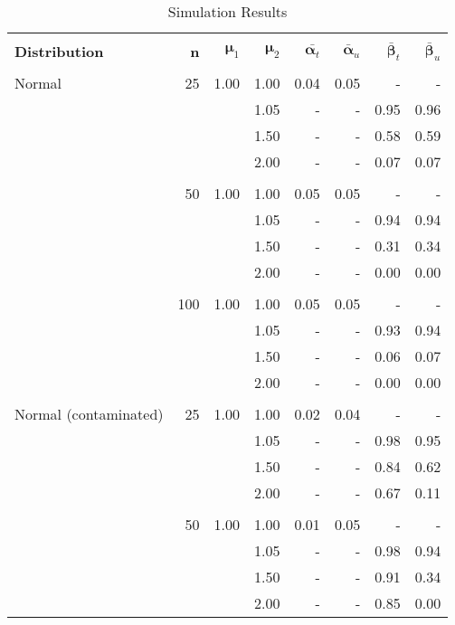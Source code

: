 \documentclass{report}
\begin{document}
\begin{table}[h]
	\centering
	\caption{Simulation Results}
	\vspace{1em}
	\begin{threeparttable}
		\begin{tabular}{|l r r r r r r r|}
			\hline
			& & & & & & & \\
			\textbf{Distribution} & 
			\textbf{n} & 
			$\bm{\mu}_1$ &
			$\bm{\mu}_2$ &
			$\bar{\bm{\alpha}_t}$ & 
			$\bar{\bm{\alpha}}_u$ & 
			$\bar{\bm{\beta}}_t$ &
			$\bar{\bm{\beta}}_u$ \\

			& & & & & & & \\

			Normal &  25 & 1.00 & 1.00 & 0.04 & 0.05 & - & - \\ 
			&  & & 1.05 & - & - & 0.95 & 0.96 \\ 
			&  & & 1.50 & - & - & 0.58 & 0.59 \\ 
			&  & & 2.00 & - & - & 0.07 & 0.07 \\ 
			& & & & & & & \\
			&  50 & 1.00 & 1.00 & 0.05 & 0.05 & - & - \\ 
			&  & & 1.05 & - & - & 0.94 & 0.94 \\ 
			&  & & 1.50 & - & - & 0.31 & 0.34 \\ 
			&  & & 2.00 & - & - & 0.00 & 0.00 \\ 
			& & & & & & & \\
			& 100 & 1.00 & 1.00 & 0.05 & 0.05 & - & - \\ 
			& & & 1.05 & - & - & 0.93 & 0.94 \\ 
			& & & 1.50 & - & - & 0.06 & 0.07 \\ 
			& & & 2.00 & - & - & 0.00 & 0.00 \\ 
			& & & & & & & \\
			Normal (contaminated) &  25 & 1.00 & 1.00 & 0.02 & 0.04
			& - & - \\ 
			&   & & 1.05 & - & - & 0.98 & 0.95 \\ 
			&   & & 1.50 & - & - & 0.84 & 0.62 \\ 
			&   & & 2.00 & - & - & 0.67 & 0.11 \\ 
			& & & & & & & \\
			&  50 & 1.00 & 1.00 & 0.01 & 0.05 & - & - \\ 
			&   & & 1.05 & - & - & 0.98 & 0.94 \\ 
			&   & & 1.50 & - & - & 0.91 & 0.34 \\ 
			&   & & 2.00 & - & - & 0.85 & 0.00 \\ 

\end{tabular}
\end{threeparttable}
\end{table}
\end{document}
